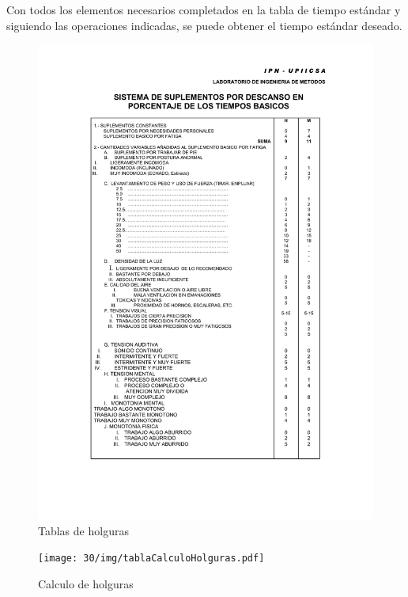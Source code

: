     Con todos los elementos necesarios completados en la tabla de tiempo estándar y siguiendo las operaciones indicadas, se puede obtener el tiempo estándar deseado.
    \begin{figure}[H]
        \centering
        \includegraphics[scale=0.23]{30/img/tablaHolguras.pdf}
        \caption{Tablas de holguras}
        \label{fig:tablasholguras}
    \end{figure}
    \begin{figure}[H]
        \centering
        \texttt{[image: 30/img/tablaCalculoHolguras.pdf]}
        \caption{Calculo de holguras}
        \label{fig:calculodeholguras}
    \end{figure}
